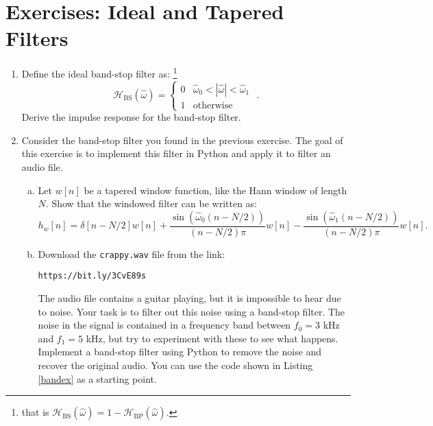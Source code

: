 \newpage
\section{Exercises: Ideal and Tapered Filters}

\begin{enumerate}
\item Define the ideal band-stop filter as: \footnote{that is $\mathcal{H}_{\mathrm{BS}}(\hat{\omega})=1 - \mathcal{H}_{\mathrm{BP}}(\hat{\omega})$.}
\begin{equation}
\mathcal{H}_{\mathrm{BS}}(\hat{\omega}) = \left\{ \begin{array}{cc}
0 & \hat{\omega}_0 < |\hat{\omega}| < \hat{\omega}_1 \\
1 & \mathrm{otherwise}
\end{array}\right.\,\,.
\end{equation}
Derive the impulse response for the band-stop filter.

\item Consider the band-stop filter you found in the previous exercise. 
The goal of this exercise is to implement this filter in Python and apply it to filter an audio file.

\begin{enumerate}[a)]
\item Let $w[n]$ be a tapered window function, like the Hann window of length $N$. Show that the windowed filter can be written as:
$$h_{w}[n]=\delta[n-N/2]w[n] +  \frac{\sin(\hat{\omega}_{0}(n-N/2))}{(n-N/2)\pi}w[n] - \frac{\sin(\hat{\omega}_{1}(n-N/2))}{(n-N/2)\pi}w[n].$$

\item Download the \verb|crappy.wav| file from the link:
\begin{center}
\verb|https://bit.ly/3CvE89s| 
\end{center}
The audio file contains a guitar playing, but it is impossible to hear due to noise. 
Your task is to filter out this noise using a band-stop filter. 
The noise in the signal is contained in a frequency band between $f_{0}=3$ kHz and $f_{1}=5$ kHz, 
but try to experiment with these to see what happens. Implement a band-stop filter using 
Python to remove the noise and recover the original audio. You can use the code shown in Listing \ref{bandex} 
as a starting point. 
\end{enumerate}



\end{enumerate}

